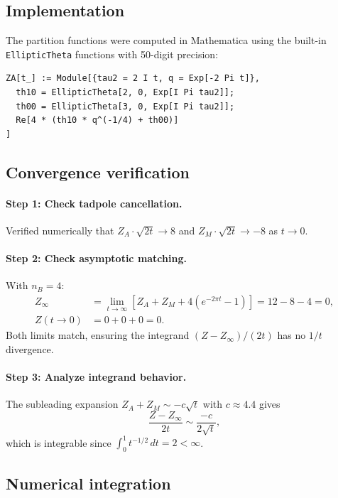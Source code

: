 \documentclass[11pt]{article}
\begin{document}
\subsection{Implementation}

The partition functions were computed in Mathematica using the built-in \texttt{EllipticTheta} functions with 50-digit precision:
\begin{verbatim}
ZA[t_] := Module[{tau2 = 2 I t, q = Exp[-2 Pi t]},
  th10 = EllipticTheta[2, 0, Exp[I Pi tau2]];
  th00 = EllipticTheta[3, 0, Exp[I Pi tau2]];
  Re[4 * (th10 * q^(-1/4) + th00)]
]
\end{verbatim}

\subsection{Convergence verification}

\paragraph{Step 1: Check tadpole cancellation.}
Verified numerically that $Z_A \cdot \sqrt{2t} \to 8$ and $Z_M \cdot \sqrt{2t} \to -8$ as $t \to 0$.

\paragraph{Step 2: Check asymptotic matching.}
With $n_B = 4$:
\begin{align}
Z_\infty &= \lim_{t\to\infty}[Z_A + Z_M + 4(e^{-2\pi t} - 1)] = 12 - 8 - 4 = 0, \\
Z(t\to 0) &= 0 + 0 + 0 = 0.
\end{align}
Both limits match, ensuring the integrand $(Z - Z_\infty)/(2t)$ has no $1/t$ divergence.

\paragraph{Step 3: Analyze integrand behavior.}
The subleading expansion $Z_A + Z_M \sim -c\sqrt{t}$ with $c \approx 4.4$ gives
\begin{equation}
\frac{Z - Z_\infty}{2t} \sim \frac{-c}{2\sqrt{t}},
\end{equation}
which is integrable since $\int_0^1 t^{-1/2}\, dt = 2 < \infty$.

\subsection{Numerical integration}
\end{document}
